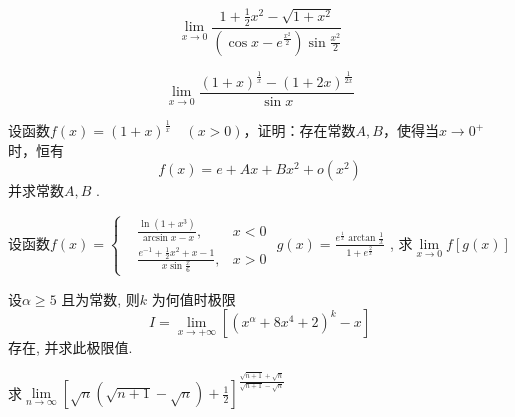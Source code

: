 \begin{question}
    \begin{equation}
        \nonumber
        \lim\limits_{x \to 0} \frac{ 1 + \frac{1}{2} x^2 - \sqrt{ 1 + x^2 } }{ ( \cos x - e^{ \frac{x^2}{2} }) \sin \frac{x^2}{2} }
    \end{equation}
\end{question}

\begin{question}
    \begin{equation*}
        \lim\limits_{x \to 0} \frac{ ( 1 + x )^{ \frac{1}{x} } -( 1 + 2x )^{ \frac{1}{2x} } }{ \sin x }
    \end{equation*}
\end{question}

\begin{question}
    设函数$ f(x) = (1 + x)^{\frac{1}{x}} \quad (x > 0) $，证明：存在常数$ A, B $，使得当$ x \to 0^+ $时，恒有
    \begin{equation*}
        f(x) = e + Ax +Bx^2 + o(x^2)
    \end{equation*}   
    并求常数$ A, B $ .
\end{question}

\begin{question}
    设函数$ f(x) = \left\{
        \begin{aligned}
            &\frac{ \ln(1 + x^3) }{ \arcsin x - x }, & x < 0   \\
            &\frac{ e^{-1} + \frac{1}{2} x^2 + x -1 }{ x \sin \frac{x}{6} }, & x > 0
        \end{aligned}  
    \right. $ 
    $ g(x) = \frac{ e^{\frac{1}{x}} \arctan \frac{1}{x} }{ 1 + e^{\frac{2}{x}} } $ , 求$ \lim\limits_{x \to 0} f [ g( x ) ] $ 
\end{question}

\begin{question}
    设$ \alpha \ge 5 $ 且为常数, 则$ k $ 为何值时极限
    \begin{equation*}
        I = \lim\limits_{x \to + \infty} [( x^\alpha + 8x^4 +2 )^k - x]
    \end{equation*}
    存在, 并求此极限值.
\end{question}

\begin{question}
    求$ \lim\limits_{n \to \infty} [ \sqrt{n} ( \sqrt{ n + 1 } - \sqrt{n} ) + \frac{1}{2} ]^{\frac{ \sqrt{ n + 1 } + \sqrt{n} }{ \sqrt{ n + 1 } -\sqrt{n} }} $ 
\end{question}

